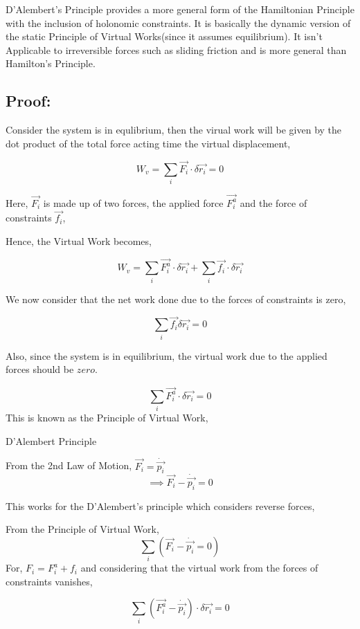 \documentclass[a4paper]{article}
\begin{document}
		D'Alembert's Principle provides a more general form of the Hamiltonian Principle with the inclusion of holonomic constraints. It is basically the dynamic version of the static Principle of Virtual Works(since it assumes equilibrium).
		It isn't Applicable to irreversible forces such as sliding friction and is more general than Hamilton's Principle.

		\subsection*{Proof: }

			Consider the system is in equlibrium, then the virual work will be given by the dot product of the total force acting time the virtual displacement,

			$$ W_v = \sum_i \vec{F_i} \cdot \delta \vec{r_i} = 0 $$

			Here, $\vec{F_i}$ is made up of two forces, the applied force $\vec{F_i^a}$ and the force of constraints $\vec{f_i}$,

			Hence, the Virtual Work becomes,

			$$ W_v = \sum_i \vec{F_i^a} \cdot \delta \vec{r_i} + \sum_i \vec{f_i} \cdot \delta \vec{r_i} $$

			We now consider that the net work done due to the forces of constraints is zero, 

			$$ \sum_i \vec{f_i} \delta \vec{r_i} = 0 $$

			Also, since the system is in equilibrium, the virtual work due to the applied forces should be $zero$.

			\begin{equation}
				\sum_i \vec{F_i^a} \cdot \delta \vec{r_i} = 0 \label{eq_pvw} 
			\end{equation} 		
			This is known as the Principle of Virtual Work, 
			
			D'Alembert Principle
			
			From the 2nd Law of Motion, $\vec{F_i} = \dot{\vec{p_i}}$
			$$ \implies \vec{F_i} - \dot{\vec{p_i}} = 0 $$
			
			This works for the D'Alembert's principle which considers reverse forces,

			From the Principle of Virtual Work,
				$$ \sum_i ( \vec{F_i} - \dot{\vec{p_i}} = 0 ) $$
			For, $F_i = F_i^a + f_i$ and considering that the virtual work from the forces of constraints vanishes, 

			$$ \sum_i(\vec{F_i^a} - \dot{\vec{p_i}}) \cdot \delta \vec{r_i} = 0 $$
			
\end{document}

